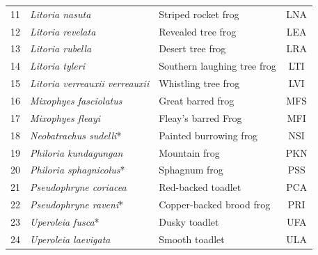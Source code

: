 \begin{table}[htb!]
{\begin{tabular}{cllc}
11                                 & \textit{Litoria nasuta}               & Striped rocket frog                                             & LNA                                \\ 
12                                 & \textit{Litoria revelata}             & Revealed tree frog                                             & LEA                                \\ 
13                                 & \textit{Litoria rubella}              & Desert tree frog                                                 & LRA                                \\ 
14                                 & \textit{Litoria tyleri}               & Southern laughing tree frog                                     & LTI                                \\ 
15                                 & \textit{Litoria verreauxii verreauxii}           & Whistling tree frog                                           & LVI                                \\ 
16                                 & \textit{Mixophyes fasciolatus}        & Great barred frog                                               & MFS                                \\ 
17                                 & \textit{Mixophyes fleayi}             & Fleay's barred Frog                                             & MFI                                \\ 
18                                 & \textit{Neobatrachus sudelli}*        & Painted burrowing frog                                           & NSI                                \\ 
19                                 & \textit{Philoria kundagungan}         & Mountain frog                                                     & PKN                                \\ 
20                                 & \textit{Philoria sphagnicolus}*        & Sphagnum frog                                                    & PSS                                \\ 
21                                 & \textit{Pseudophryne coriacea}        & Red-backed toadlet                                            & PCA                                \\ 
22                                 & \textit{Pseudophryne raveni}*          & Copper-backed brood frog                                        & PRI                                \\ 
23                                 & \textit{Uperoleia fusca}*             & Dusky toadlet                                                   & UFA                                \\ 
24                                 & \textit{Uperoleia laevigata}          & Smooth toadlet                                                 & ULA                                \\ \hline\hline
\end{tabular}
}
\label{tab:Ch4_frogName}
\end{table}



